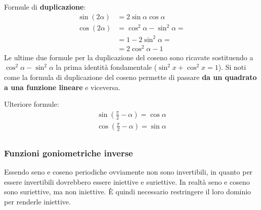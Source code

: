 Formule di \textbf{duplicazione}:\label{formuleDuplicazione}
\begin{align*}
    \sin(2\alpha) &= 2\sin{\alpha}\cos{\alpha}\\
    \cos(2\alpha) &= \cos^2{\alpha} - \sin^2{\alpha} =\\
    &= 1 - 2\sin^2{\alpha} = \\
    &= 2\cos^2{\alpha} - 1
\end{align*}
Le ultime due formule per la duplicazione del coseno sono ricavate sostituendo a $\cos^2{\alpha} - \sin^2{\alpha}$ la prima identità fondamentale ($\sin^2{x} + \cos^2{x} = 1$). Si noti come la formula di duplicazione del coseno permette di passare \textbf{da un quadrato a una funzione lineare} e viceversa.

Ulteriore formule:
\begin{gather*}
    \sin\left(\frac{\pi}{2}-\alpha\right) = \cos{\alpha}\\
    \cos\left(\frac{\pi}{2}-\alpha\right) = \sin{\alpha}\\
\end{gather*}

\subsubsection{Funzioni goniometriche inverse}

Essendo seno e coseno periodiche ovviamente non sono invertibili, in quanto per essere invertibili dovrebbero essere iniettive e suriettive. In realtà seno e coseno sono suriettive, ma non iniettive. È quindi necessario restringere il loro dominio per renderle iniettive.

